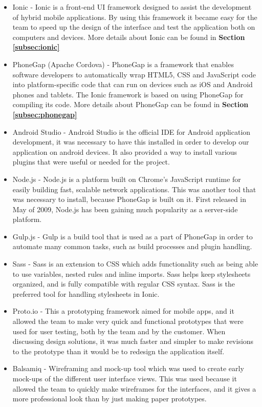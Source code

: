 \begin{itemize}
	\item Ionic \cite{es1} - Ionic is a front-end UI framework designed to assist the development of hybrid mobile applications. By using this framework it became easy for the team to speed up the design of the interface and test the application both on computers and devices. More details about Ionic can be found in \textbf{Section \ref{subsec:ionic}}
	\item PhoneGap (Apache Cordova) \cite{RA2} - PhoneGap is a framework that enables software developers to automatically wrap HTML5, CSS and JavaScript code into platform-specific code that can run on devices such as iOS and Android phones and tablets. The Ionic framework is based on using PhoneGap for compiling its code. More details about PhoneGap can be found in \textbf{Section \ref{subsec:phonegap}}
	\item Android Studio \cite{es22} - Android Studio is the official IDE for Android application development, it was necessary to have this installed in order to develop our application on android devices. It also provided a way to install various plugins that were useful or needed for the project.
	\item Node.js \cite{es23} - Node.js is a platform built on Chrome's JavaScript runtime for easily building fast, scalable network applications. This was another tool that was necessary to install, because PhoneGap is built on it. First released in May of 2009, Node.js has been gaining much popularity as a server-side platform. 
	\item Gulp.js \cite{es24} - Gulp is a build tool that is used as a part of PhoneGap in order to automate many common tasks, such as build processes and plugin handling.
	\item Sass \cite{es25} - Sass is an extension to CSS which adds functionality such as being able to use variables, nested rules and inline imports. Sass helps keep stylesheets organized, and is fully compatible with regular CSS syntax. Sass is the preferred tool for handling stylesheets in Ionic.
	\item Proto.io \cite{protoIO} - This a prototyping framework aimed for mobile apps, and it allowed the team to make very quick and functional prototypes that were used for user testing, both by the team and by the customer. When discussing design solutions, it was much faster and simpler to make revisions to the prototype than it would be to redesign the application itself. 
	\item Balsamiq \cite{es3} - Wireframing and mock-up tool which was used to create early mock-ups of the different user interface views. This was used because it allowed the team to quickly make wireframes for the interfaces, and it gives a more professional look than by  just making paper prototypes.

\end{itemize}
